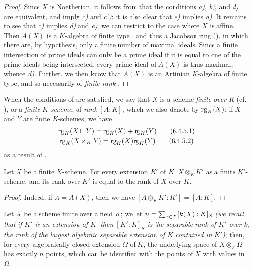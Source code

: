 \begin{proof}
\label{proof-1.6.4.4}
Since $X$ is Noetherian, it follows from  that the conditions \emph{a)}, \emph{b)}, and \emph{d)} are equivalent, and imply \emph{c)} and \emph{c')};
it is also clear that \emph{e)} implies \emph{a)}.
It remains to see that \emph{c)} implies \emph{d)} and \emph{e)};
we can restrict to the case where $X$ is affine.
Then $A(X)$ is a $K$-algebra of finite type , and thus a Jacobson ring (\cite[p.~3-11 and 3-12]{I-1}), in which there are, by hypothesis, only a finite number of maximal ideals.
Since a finite intersection of prime ideals can only be a prime ideal if it is equal to one of the prime ideals being intersected, every prime ideal of $A(X)$ is thus maximal, whence \emph{d)}.
Further, we then know  that $A(X)$ is an Artinian $K$-algebra of finite type, and so necessarily of \emph{finite rank} \cite{I-21}.
\end{proof}

\begin{env}[6.4.5]
\label{1.6.4.5}
When the conditions of  are satisfied, we say that $X$ is a scheme \emph{finite over $K$} (cf. ), or a \emph{finite $K$-scheme}, of \emph{rank} $[A:K]$, which we also denote by ${\mathop{\mathrm{rg}}}_K(X)$;
if $X$ and $Y$ are finite $K$-schemes, we have
\begin{gather*}
{\mathop{\mathrm{rg}}}_K(X\sqcup Y) = {\mathop{\mathrm{rg}}}_K(X)+{\mathop{\mathrm{rg}}}_K(Y)\tag{6.4.5.1}\\
{\mathop{\mathrm{rg}}}_K(X\times_K Y) = {\mathop{\mathrm{rg}}}_K(X){\mathop{\mathrm{rg}}}_K(Y)\tag{6.4.5.2}
\end{gather*}
as a result of .
\end{env}

\begin{cor}[6.4.6]
\label{1.6.4.6}
Let $X$ be a finite $K$-scheme.
For every extension $K'$ of $K$, $X\otimes_K K'$ as a finite $K'$-scheme, and its rank over $K'$ is equal to the rank of $X$ over $K$.
\end{cor}

\begin{proof}
\label{proof-1.6.4.6}
Indeed, if $A=A(X)$, then we have $[A\otimes_K K':K']=[A:K]$.
\end{proof}

\begin{cor}[6.4.7]
\label{1.6.4.7}
Let $X$ be a scheme finite over a field $K$;
we let $n=\sum_{x\in X}[k(X):K]_S$ \emph{(we recall that if $K'$ is an extension of $K$, then $[K':K]_S$ is the \emph{separable rank} of $K'$ over $k$, the rank of the largest algebraic separable extension of $K$ contained in $K'$)};
then, for every algebraically closed extension $\Omega$ of $K$, the underlying space of $X\otimes_K\Omega$ has exactly $n$ points, which can be identified with the points of $X$ with values in $\Omega$.
\end{cor}

